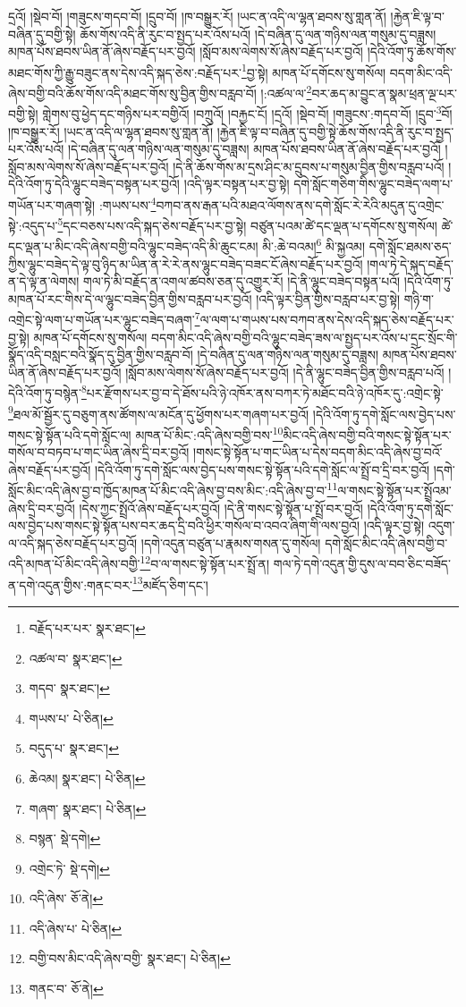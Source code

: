 དྲའོ། །སྡེབ་བོ། །གཟུངས་གདབ་བོ། །དྲུབ་བོ། །ཁ་བསྒྱུར་རོ། །ཡང་ན་འདི་ལ་ལྷན་ཐབས་སུ་གླན་ནོ། །རྐྱེན་ཇི་ལྟ་བ་བཞིན་དུ་བགྱི་སྟེ། ཆོས་གོས་འདི་ནི་རུང་བ་སྤྱད་པར་འོས་པའོ། །དེ་བཞིན་དུ་ལན་གཉིས་ལན་གསུམ་དུ་བཟླས། མཁན་པོས་ཐབས་ཡིན་ནོ་ཞེས་བརྗོད་པར་བྱའོ། །སློབ་མས་ལེགས་སོ་ཞེས་བརྗོད་པར་བྱའོ། །དེའི་འོག་ཏུ་ཆོས་གོས་མཐང་གོས་ཀྱི་རྒྱུ་བཟུང་ནས་དེས་འདི་སྐད་ཅེས་:བརྗོད་པར་\footnote{བརྗོད་པར་པར་  སྣར་ཐང་། }བྱ་སྟེ། མཁན་པོ་དགོངས་སུ་གསོལ། བདག་མིང་འདི་ཞེས་བགྱི་བའི་ཆོས་གོས་འདི་མཐང་གོས་སུ་བྱིན་གྱིས་བརླབ་བོ། །:འཚལ་ལ་\footnote{འཚལ་བ་  སྣར་ཐང་། }བར་ཆད་མ་བྱུང་ན་སྣམ་ཕྲན་ལྔ་པར་བགྱི་སྟེ། གླེགས་བུ་ཕྱེད་དང་གཉིས་པར་བགྱིའོ། །བཀྲུའོ། །བརྐྱང་ངོ། །དྲའོ། །སྡེབ་བོ། །གཟུངས་:གདབ་བོ། །དྲུབ་\footnote{གདབ་  སྣར་ཐང་། }བོ། །ཁ་བསྒྱུར་རོ། །ཡང་ན་འདི་ལ་ལྷན་ཐབས་སུ་གླན་ནོ། །རྐྱེན་ཇི་ལྟ་བ་བཞིན་དུ་བགྱི་སྟེ་ཆོས་གོས་འདི་ནི་རུང་བ་སྤྱད་པར་འོས་པའོ། །དེ་བཞིན་དུ་ལན་གཉིས་ལན་གསུམ་དུ་བཟླས། མཁན་པོས་ཐབས་ཡིན་ནོ་ཞེས་བརྗོད་པར་བྱའོ། །སློབ་མས་ལེགས་སོ་ཞེས་བརྗོད་པར་བྱའོ། །དེ་ནི་ཆོས་གོས་མ་དྲས་ཤིང་མ་དྲུབས་པ་གསུམ་བྱིན་གྱིས་བརླབ་པའོ། །དེའི་འོག་ཏུ་དེའི་ལྷུང་བཟེད་བསྟན་པར་བྱའོ། །འདི་ལྟར་བསྟན་པར་བྱ་སྟེ། དགེ་སློང་གཅིག་གིས་ལྷུང་བཟེད་ལག་པ་གཡོན་པར་གཞག་སྟེ། :གཡས་པས་\footnote{གཡས་པ་  པེ་ཅིན། }བཀབ་ནས་རྒན་པའི་མཐའ་ལོགས་ནས་དགེ་སློང་རེ་རེའི་མདུན་དུ་འགྲེང་སྟེ་:འདུད་པ་\footnote{བདུད་པ་  སྣར་ཐང་། }དང་བཅས་པས་འདི་སྐད་ཅེས་བརྗོད་པར་བྱ་སྟེ། བཙུན་པའམ་ཚེ་དང་ལྡན་པ་དགོངས་སུ་གསོལ། ཚེ་དང་ལྡན་པ་མིང་འདི་ཞེས་བགྱི་བའི་ལྷུང་བཟེད་འདི་མི་ཆུང་ངམ། མི་:ཆེ་བའམ།\footnote{ཆེའམ།  སྣར་ཐང་།  པེ་ཅིན། } མི་སྐྱའམ། དགེ་སློང་ཐམས་ཅད་ཀྱིས་ལྷུང་བཟེད་དེ་ལྟ་བུ་ཉིད་མ་ཡིན་ན་རེ་རེ་ནས་ལྷུང་བཟེད་བཟང་ངོ་ཞེས་བརྗོད་པར་བྱའོ། །གལ་ཏེ་དེ་སྐད་བརྗོད་ན་དེ་ལྟ་ན་ལེགས། གལ་ཏེ་མི་བརྗོད་ན་འགལ་ཚབས་ཅན་དུ་འགྱུར་རོ། །དེ་ནི་ལྷུང་བཟེད་བསྟན་པའོ། །དེའི་འོག་ཏུ་མཁན་པོ་རང་གིས་དེ་ལ་ལྷུང་བཟེད་བྱིན་གྱིས་བརླབ་པར་བྱའོ། །འདི་ལྟར་བྱིན་གྱིས་བརླབ་པར་བྱ་སྟེ། གཉི་ག་འགྲེང་སྟེ་ལག་པ་གཡོན་པར་ལྷུང་བཟེད་བཞག་\footnote{གཞག་  སྣར་ཐང་།  པེ་ཅིན། }ལ་ལག་པ་གཡས་པས་བཀབ་ནས་དེས་འདི་སྐད་ཅེས་བརྗོད་པར་བྱ་སྟེ། མཁན་པོ་དགོངས་སུ་གསོལ། བདག་མིང་འདི་ཞེས་བགྱི་བའི་ལྷུང་བཟེད་ཟས་ལ་སྤྱད་པར་འོས་པ་དྲང་སྲོང་གི་སྣོད་འདི་བསླང་བའི་སྣོད་དུ་བྱིན་གྱིས་བརླབ་བོ། །དེ་བཞིན་དུ་ལན་གཉིས་ལན་གསུམ་དུ་བཟླས། མཁན་པོས་ཐབས་ཡིན་ནོ་ཞེས་བརྗོད་པར་བྱའོ། །སློབ་མས་ལེགས་སོ་ཞེས་བརྗོད་པར་བྱའོ། །དེ་ནི་ལྷུང་བཟེད་བྱིན་གྱིས་བརླབ་པའོ། །དེའི་འོག་ཏུ་བསྙེན་\footnote{བསྙན་  སྡེ་དགེ། }པར་རྫོགས་པར་བྱ་བ་དེ་ཐོས་པའི་ཉེ་འཁོར་ནས་བཀར་ཏེ་མཐོང་བའི་ཉེ་འཁོར་དུ་:འགྲེང་སྟེ་\footnote{འགྲེང་ཏེ་  སྡེ་དགེ། }ཐལ་མོ་སྦྱོར་དུ་བཅུག་ནས་ཚོགས་ལ་མངོན་དུ་ཕྱོགས་པར་གཞག་པར་བྱའོ། །དེའི་འོག་ཏུ་དགེ་སློང་ལས་བྱེད་པས་གསང་སྟེ་སྟོན་པའི་དགེ་སློང་ལ། མཁན་པོ་མིང་:འདི་ཞེས་བགྱི་བས་\footnote{འདི་ཞེས་  ཅོ་ནེ། }མིང་འདི་ཞེས་བགྱི་བའི་གསང་སྟེ་སྟོན་པར་གསོལ་བ་བཏབ་པ་གང་ཡིན་ཞེས་དྲི་བར་བྱའོ། །གསང་སྟེ་སྟོན་པ་གང་ཡིན་པ་དེས་བདག་མིང་འདི་ཞེས་བྱ་བའོ་ཞེས་བརྗོད་པར་བྱའོ། །དེའི་འོག་ཏུ་དགེ་སློང་ལས་བྱེད་པས་གསང་སྟེ་སྟོན་པའི་དགེ་སློང་ལ་སྤྲོ་བ་དྲི་བར་བྱའོ། །དགེ་སློང་མིང་འདི་ཞེས་བྱ་བ་ཁྱོད་མཁན་པོ་མིང་འདི་ཞེས་བྱ་བས་མིང་:འདི་ཞེས་བྱ་བ་\footnote{འདི་ཞེས་པ་  པེ་ཅིན། }ལ་གསང་སྟེ་སྟོན་པར་སྤྲོའམ་ཞེས་དྲི་བར་བྱའོ། །དེས་ཀྱང་སྤྲོའོ་ཞེས་བརྗོད་པར་བྱའོ། །དེ་ནི་གསང་སྟེ་སྟོན་པ་སྤྲོ་བར་བྱའོ། །དེའི་འོག་ཏུ་དགེ་སློང་ལས་བྱེད་པས་གསང་སྟེ་སྟོན་པས་བར་ཆད་དྲི་བའི་ཕྱིར་གསོལ་བ་འབའ་ཞིག་གི་ལས་བྱའོ། །འདི་ལྟར་བྱ་སྟེ། འདུག་ལ་འདི་སྐད་ཅེས་བརྗོད་པར་བྱའོ། །དགེ་འདུན་བཙུན་པ་རྣམས་གསན་དུ་གསོལ། དགེ་སློང་མིང་འདི་ཞེས་བགྱི་བ་འདི་མཁན་པོ་མིང་འདི་ཞེས་བགྱི་\footnote{བགྱི་བས་མིང་འདི་ཞེས་བགྱི་  སྣར་ཐང་།  པེ་ཅིན། }བ་ལ་གསང་སྟེ་སྟོན་པར་སྤྲོ་ན། གལ་ཏེ་དགེ་འདུན་གྱི་དུས་ལ་བབ་ཅིང་བཟོད་ན་དགེ་འདུན་གྱིས་:གནང་བར་\footnote{གནང་བ་  ཅོ་ནེ། }མཛོད་ཅིག་དང་། 